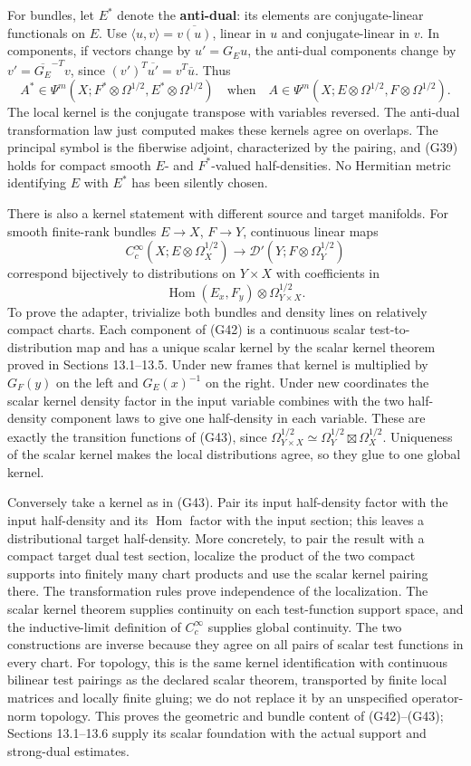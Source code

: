 \documentclass[
  11pt,
]{article}
\begin{document}
For bundles, let \(E^*\) denote the \textbf{anti-dual}: its elements are
conjugate-linear functionals on \(E\). Use
\(\langle u,v\rangle=\overline{v(u)}\), linear in \(u\) and
conjugate-linear in \(v\). In components, if vectors change by
\(u'=G_Eu\), the anti-dual components change by
\(v'=\overline{G_E}^{-T}v\), since
\((v')^T\overline{u'}=v^T\overline u\). Thus \[
A^*\in\Psi^m(X;F^*\otimes\Omega^{1/2},E^*\otimes\Omega^{1/2})
\quad\text{when}\quad
A\in\Psi^m(X;E\otimes\Omega^{1/2},F\otimes\Omega^{1/2}).
\tag{G41}
\] The local kernel is the conjugate transpose with variables reversed.
The anti-dual transformation law just computed makes these kernels agree
on overlaps. The principal symbol is the fiberwise adjoint,
characterized by the pairing, and (G39) holds for compact smooth \(E\)-
and \(F^*\)-valued half-densities. No Hermitian metric identifying \(E\)
with \(E^*\) has been silently chosen.

There is also a kernel statement with different source and target
manifolds. For smooth finite-rank bundles \(E\to X\), \(F\to Y\),
continuous linear maps \[
C_c^\infty(X;E\otimes\Omega_X^{1/2})
\longrightarrow\mathcal D'(Y;F\otimes\Omega_Y^{1/2})
\tag{G42}
\] correspond bijectively to distributions on \(Y\times X\) with
coefficients in \[
\operatorname{Hom}(E_x,F_y)\otimes\Omega_{Y\times X}^{1/2}.
\tag{G43}
\] To prove the adapter, trivialize both bundles and density lines on
relatively compact charts. Each component of (G42) is a continuous
scalar test-to-distribution map and has a unique scalar kernel by the
scalar kernel theorem proved in Sections 13.1--13.5. Under new frames
that kernel is multiplied by \(G_F(y)\) on the left and \(G_E(x)^{-1}\)
on the right. Under new coordinates the scalar kernel density factor in
the input variable combines with the two half-density component laws to
give one half-density in each variable. These are exactly the transition
functions of (G43), since
\(\Omega_{Y\times X}^{1/2}\simeq\Omega_Y^{1/2}\boxtimes\Omega_X^{1/2}\).
Uniqueness of the scalar kernel makes the local distributions agree, so
they glue to one global kernel.

Conversely take a kernel as in (G43). Pair its input half-density factor
with the input half-density and its \(\operatorname{Hom}\) factor with
the input section; this leaves a distributional target half-density.
More concretely, to pair the result with a compact target dual test
section, localize the product of the two compact supports into finitely
many chart products and use the scalar kernel pairing there. The
transformation rules prove independence of the localization. The scalar
kernel theorem supplies continuity on each test-function support space,
and the inductive-limit definition of \(C_c^\infty\) supplies global
continuity. The two constructions are inverse because they agree on all
pairs of scalar test functions in every chart. For topology, this is the
same kernel identification with continuous bilinear test pairings as the
declared scalar theorem, transported by finite local matrices and
locally finite gluing; we do not replace it by an unspecified
operator-norm topology. This proves the geometric and bundle content of
(G42)--(G43); Sections 13.1--13.6 supply its scalar foundation with the
actual support and strong-dual estimates.
\end{document}
